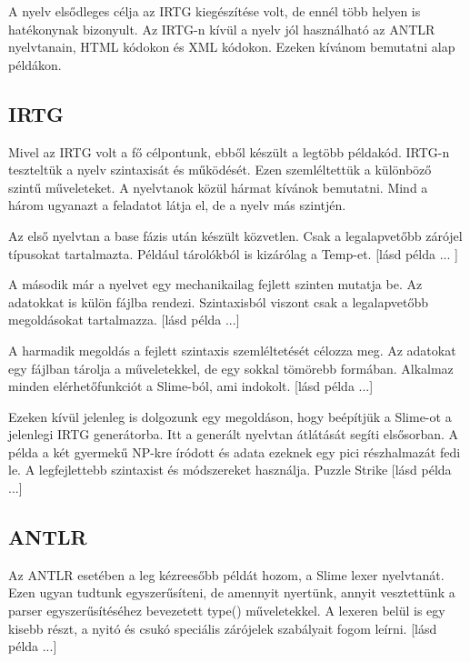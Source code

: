 {

A nyelv elsődleges célja az IRTG kiegészítése volt, de ennél több helyen is hatékonynak bizonyult.
Az IRTG-n kívül a nyelv jól használható az ANTLR nyelvtanain, HTML kódokon és XML kódokon.
Ezeken kívánom bemutatni alap példákon.


\subsection{IRTG}
Mivel az IRTG volt a fő célpontunk, ebből készült a legtöbb példakód.
IRTG-n teszteltük a nyelv szintaxisát és működését.
Ezen szemléltettük a különböző szintű műveleteket.
A nyelvtanok közül hármat kívánok bemutatni.
Mind a három ugyanazt a feladatot látja el, de a nyelv más szintjén.

Az első nyelvtan a base fázis után készült közvetlen.
Csak a legalapvetőbb zárójel típusokat tartalmazta.
Például tárolókból is kizárólag a Temp-et.
[lásd példa ... ]

A második már a nyelvet egy mechanikailag fejlett szinten mutatja be.
Az adatokkat is külön fájlba rendezi.
Szintaxisból viszont csak a legalapvetőbb megoldásokat tartalmazza.
[lásd példa ...]

A harmadik megoldás a fejlett szintaxis szemléltetését célozza meg.
Az adatokat egy fájlban tárolja a műveletekkel, de egy sokkal tömörebb formában.
Alkalmaz minden elérhetőfunkciót a Slime-ból, ami indokolt.
[lásd példa ...]

Ezeken kívül jelenleg is dolgozunk egy megoldáson, hogy beépítjük a Slime-ot a jelenlegi IRTG generátorba.
Itt a generált nyelvtan átlátását segíti elsősorban.
A példa a két gyermekű NP-kre íródott és adata ezeknek egy pici részhalmazát fedi le.
A legfejlettebb szintaxist és módszereket használja. Puzzle Strike
[lásd példa ...]

\subsection{ANTLR}
Az ANTLR esetében a leg kézreesőbb példát hozom, a Slime lexer nyelvtanát. 
Ezen ugyan tudtunk egyszerűsíteni, de amennyit nyertünk, annyit vesztettünk a parser egyszerűsítéséhez bevezetett type() műveletekkel.
A lexeren belül is egy kisebb részt, a nyitó és csukó speciális zárójelek szabályait fogom leírni.
[lásd példa ...]

}

